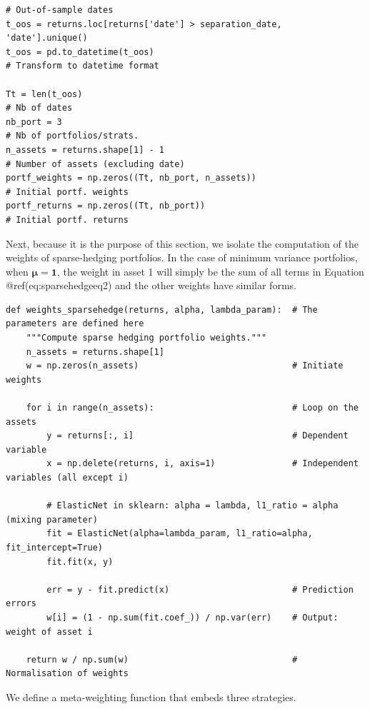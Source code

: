 \begin{verbatim}
# Out-of-sample dates
t_oos = returns.loc[returns['date'] > separation_date, 'date'].unique()
t_oos = pd.to_datetime(t_oos)                                          # Transform to datetime format

Tt = len(t_oos)                                                        # Nb of dates
nb_port = 3                                                            # Nb of portfolios/strats.
n_assets = returns.shape[1] - 1                                        # Number of assets (excluding date)
portf_weights = np.zeros((Tt, nb_port, n_assets))                      # Initial portf. weights
portf_returns = np.zeros((Tt, nb_port))                                # Initial portf. returns
\end{verbatim}

Next, because it is the purpose of this section, we isolate the computation of the weights of sparse-hedging portfolios. In the case of minimum variance portfolios, when $\boldsymbol{\mu}=\boldsymbol{1}$, the weight in asset 1 will simply be the sum of all terms in Equation @ref(eq:sparsehedgeeq2) and the other weights have similar forms.

\begin{verbatim}
def weights_sparsehedge(returns, alpha, lambda_param):  # The parameters are defined here
    """Compute sparse hedging portfolio weights."""
    n_assets = returns.shape[1]
    w = np.zeros(n_assets)                              # Initiate weights
    
    for i in range(n_assets):                           # Loop on the assets
        y = returns[:, i]                               # Dependent variable
        x = np.delete(returns, i, axis=1)               # Independent variables (all except i)
        
        # ElasticNet in sklearn: alpha = lambda, l1_ratio = alpha (mixing parameter)
        fit = ElasticNet(alpha=lambda_param, l1_ratio=alpha, fit_intercept=True)
        fit.fit(x, y)
        
        err = y - fit.predict(x)                        # Prediction errors
        w[i] = (1 - np.sum(fit.coef_)) / np.var(err)    # Output: weight of asset i
    
    return w / np.sum(w)                                # Normalisation of weights
\end{verbatim}

We define a meta-weighting function that embeds three strategies.

